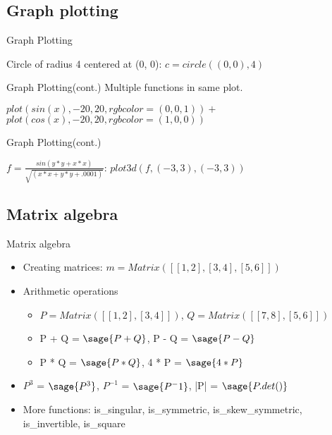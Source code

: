\documentclass{beamer}
\begin{document}
\subsection{Graph plotting}
\begin{frame}{Graph Plotting}
  \begin{center}
    Circle of radius 4 centered at (0, 0): $c = circle((0, 0), 4)$
  \end{center}
\end{frame}

\begin{frame}{Graph Plotting(cont.)}
  \centering Multiple functions in same plot.
  \begin{center}
    $plot(sin(x), -20, 20, rgbcolor = (0, 0, 1)) +$ \\ $plot(cos(x), -20, 20, rgbcolor = (1, 0, 0))$
  \end{center}
\end{frame}

\begin{frame}{Graph Plotting(cont.)}
  \begin{center}
    $f = \frac{sin(y*y+x*x)}{\sqrt{(x*x+y*y+.0001)}}$: $plot3d(f, (-3, 3), (-3, 3))$
  \end{center}
\end{frame}

\subsection{Matrix algebra}
\begin{frame}{Matrix algebra}
  \begin{itemize}
   \item Creating matrices: $m = Matrix([[1,2],[3,4],[5,6]])$
   \item Arithmetic operations
   \begin{itemize}
    \item $P = Matrix([[1, 2], [3, 4]])$, $Q = Matrix([[7, 8], [5, 6]])$
    \item P + Q = $\sage{P + Q}$, P - Q = $\sage{P - Q}$
    \item P * Q = $\sage{P * Q}$, 4 * P = $\sage{4 * P}$
   \end{itemize}
   \item $P^{3}$ = $\sage{P^3}$, $P^{-1}$ = $\sage{P^-1}$, |P| = $\sage{P.det()}$
   \item More functions: is\_singular, is\_symmetric, is\_skew\_symmetric, is\_invertible, is\_square
  \end{itemize}
\end{frame}
\end{document}
